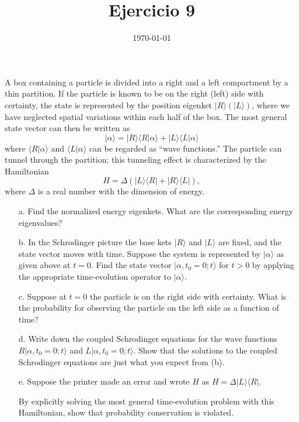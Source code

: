 \documentclass[a4paper]{article}
\date{\today}
\title{Ejercicio 9}
\begin{document}
    \header{}



    A box containing a particle is divided into a right and a left compartment by a thin
    partition. If the particle is known to be on the right (left) side with certainty, the state
    is represented by the position eigenket $|R\rangle (|L\rangle)$, where we have neglected spatial
    variations within each half of the box. The most general state vector can then be
    written as
\begin{equation}
    |\alpha\rangle = |R\rangle\langle R|\alpha \rangle+|L\rangle\langle L|\alpha\rangle
\end{equation}
where $\langle R|\alpha\rangle$ and  $\langle L|\alpha \rangle$ can be regarded as “wave functions.” The particle can tunnel
through the partition; this tunneling effect is characterized by the Hamiltonian
\begin{equation}
    H = \Delta(|L\rangle \langle R|+|R\rangle \langle L|),
\end{equation}
where $\Delta$ is a real number with the dimension of energy.
\begin{itemize}
    \item [a.] Find the normalized energy eigenkets. What are the corresponding energy 
    eigenvalues?
    \item [b.] In the Schrodinger picture the base kets $|R\rangle$ and $|L\rangle$ 
    are fixed, and the state vector moves with time. Suppose the system is represented 
    by $|\alpha \rangle$ as given above at $t = 0$. Find the state vector 
    $|\alpha,t_0 = 0; t\rangle $ for $t > 0$ by applying the appropriate 
    time-evolution operator to $|\alpha\rangle$.
    \item [c.] Suppose at $t = 0$ the particle is on the right side with certainty. What is the
    probability for observing the particle on the left side as a function of time?
    \item [d.] Write down the coupled Schrodinger equations for the wave functions
    $R|\alpha,t_0 = 0; t\rangle$ and $L|\alpha,t_0 = 0; t\rangle$. Show that the 
    solutions to the coupled Schrodinger equations are just what you expect from (b). 
    \item [e.] Suppose the printer made an error and wrote $H$ as 
    $H = \Delta|L\rangle \langle R|$. 

    By explicitly solving the most general time-evolution problem with this Hamiltonian, show that probability conservation is violated.
\end{itemize}
\end{document}
